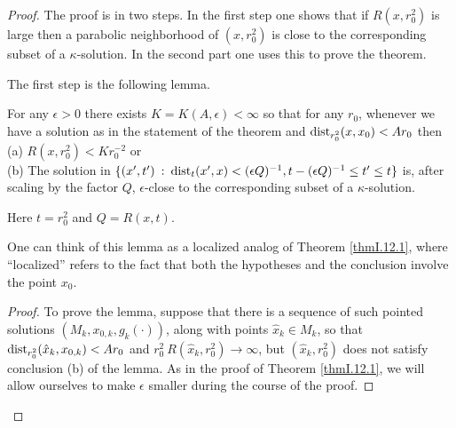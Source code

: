 \begin{proof}
The proof is in two steps.  In the first step one shows that
if $R(x, r_0^2)$ is large then a parabolic neighborhood of
$(x, r_0^2)$ is close to the corresponding subset of a
$\kappa$-solution.  In the second part one uses this to
prove the theorem.

The first step is the following lemma.

\begin{lemma}
  \label{lem:kl-later-scalar-curvature-bounds-bigger-balls-from-curvature-volume-bounds-existence-kappa-solutions}
 \label{12.2lemma}
For any $\epsilon > 0$ there exists
$K = K(A, \epsilon) < \infty$
so that for any $r_0$,
whenever we have a solution as in the statement of the theorem
and $\operatorname{dist}_{r_0^2}(x, x_0) <
A r_0$ then  \\
(a) $R(x, r_0^2) < K r_0^{-2}$ or \\
(b) The solution in
$\{(x^\prime, t^\prime) \: : \: \operatorname{dist}_{t}(x^\prime, x) <
(\epsilon Q)^{-1}, t - (\epsilon Q)^{-1} \le t^\prime \le t \}$ is,
after scaling by the factor $Q$, $\epsilon$-close to the
corresponding subset of a $\kappa$-solution.

Here $t = r_0^2$ and
$Q = R(x,t)$.
\end{lemma}
\begin{remark}
  \label{rem:kl-later-scalar-curvature-bounds-bigger-balls-from-curvature-volume-bounds-structural-remark-thick-thin-geometry}

One can think of this lemma as a
localized analog of Theorem \ref{thmI.12.1}, where ``localized'' refers to
the fact that both the hypotheses and the conclusion involve the
point $x_0$.
\end{remark}

\begin{proof}
To prove the lemma,
suppose that there is
a sequence of such pointed solutions
$(M_k, x_{0,k}, g_k(\cdot))$, along with points
$\hat{x}_k \in M_k$, so that $\operatorname{dist}_{r_0^2}(\hat{x}_k, x_{0,k}) <
A r_0$ and $r_0^2 \: R(\hat{x}_k, r_0^2) \rightarrow \infty$, but
$(\hat{x}_k, r_0^2)$ does not satisfy conclusion (b) of the
lemma. As in the proof of Theorem \ref{thmI.12.1}, we will allow ourselves to make
$\epsilon$ smaller during the course of the proof.


\end{proof}
\end{proof}
